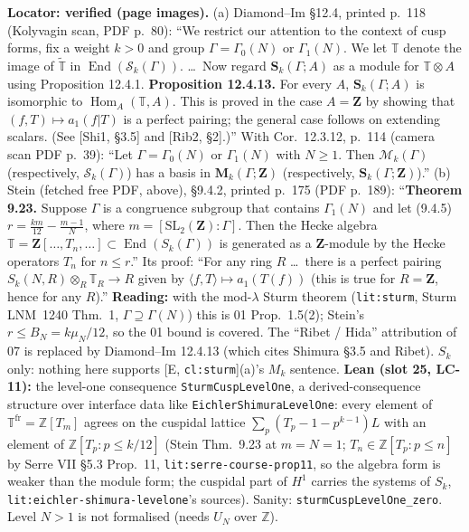 \begin{hypothesis}\label{lit:hz-sturm-integral}
  \leanok
  \textbf{Locator: verified (page images).} (a) Diamond--Im \S12.4, printed p.~118 (Kolyvagin scan, PDF p.~80): ``We restrict our
  attention to the context of cusp forms, fix a weight $k>0$ and group $\Gamma=\Gamma_0(N)$ or $\Gamma_1(N)$. We let $\mathbb T$ denote the image of
  $\tilde{\mathbb T}$ in $\operatorname{End}(\mathcal S_k(\Gamma))$. \dots\ Now regard $\mathbf S_k(\Gamma;A)$ as a module for $\mathbb T\otimes A$ using
  Proposition 12.4.1. \textbf{Proposition 12.4.13.} For every $A$, $\mathbf S_k(\Gamma;A)$ is isomorphic to $\operatorname{Hom}_A(\mathbb T,A)$. This is
  proved in the case $A=\mathbf Z$ by showing that $(f,T)\mapsto a_1(f|T)$ is a perfect pairing; the general case follows on extending
  scalars. (See [Shi1, \S3.5] and [Rib2, \S2].)'' With Cor.~12.3.12, p.~114 (camera scan PDF p.~39): ``Let $\Gamma=\Gamma_0(N)$ or $\Gamma_1(N)$
  with $N\ge1$. Then $\mathcal M_k(\Gamma)$ (respectively, $\mathcal S_k(\Gamma)$) has a basis in $\mathbf M_k(\Gamma;\mathbf Z)$ (respectively,
  $\mathbf S_k(\Gamma;\mathbf Z)$).''
  (b) Stein (fetched free PDF, above), \S9.4.2, printed p.~175 (PDF p.~189): ``\textbf{Theorem 9.23.} Suppose $\Gamma$ is a congruence subgroup
  that contains $\Gamma_1(N)$ and let (9.4.5) $r=\frac{km}{12}-\frac{m-1}{N}$, where $m=[\mathrm{SL}_2(\mathbf Z):\Gamma]$. Then the Hecke algebra
  $\mathbb T=\mathbf Z[\dots,T_n,\dots]\subset\operatorname{End}(S_k(\Gamma))$ is generated as a $\mathbf Z$-module by the Hecke operators $T_n$ for
  $n\le r$.'' Its proof: ``For any ring $R$ \dots\ there is a perfect pairing $S_k(N,R)\otimes_R\mathbb T_R\to R$ given by
  $\langle f,T\rangle\mapsto a_1(T(f))$ (this is true for $R=\mathbf Z$, hence for any $R$).''
  \textbf{Reading:} with the mod-$\lambda$ Sturm theorem (\texttt{lit:sturm}, Sturm LNM~1240 Thm.~1, $\Gamma\supseteq\Gamma(N)$) this is 01
  Prop.~1.5(2); Stein's $r\le B_N=k\mu_N/12$, so the 01 bound is covered. The ``Ribet / Hida'' attribution of 07 is replaced by Diamond--Im
  12.4.13 (which cites Shimura \S3.5 and Ribet). $S_k$ only: nothing here supports [E, \texttt{cl:sturm}](a)'s $M_k$ sentence.
  \textbf{Lean (slot 25, LC-11):} the level-one consequence \texttt{SturmCuspLevelOne}, a derived-consequence structure over interface
  data like \texttt{EichlerShimuraLevelOne}: every element of $\mathbb T^{\mathrm{fr}}=\mathbb Z[T_m]$ agrees on the cuspidal lattice
  $\sum_p(T_p-1-p^{k-1})L$ with an element of $\mathbb Z[T_p:p\le k/12]$ (Stein Thm.~9.23 at $m=N=1$; $T_n\in\mathbb Z[T_p:p\le n]$ by Serre
  VII \S5.3 Prop.~11, \texttt{lit:serre-course-prop11}, so the algebra form is weaker than the module form; the cuspidal part of $H^1$ carries
  the systems of $S_k$, \texttt{lit:eichler-shimura-levelone}'s sources). Sanity: \texttt{sturmCuspLevelOne\_zero}. Level $N>1$ is not
  formalised (needs $U_N$ over $\mathbb Z$).
\end{hypothesis}

